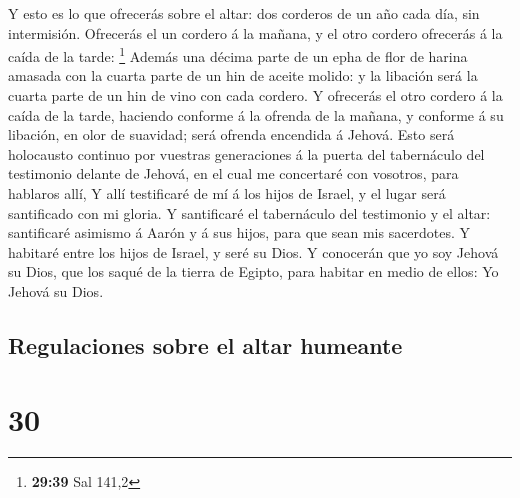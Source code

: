  Y esto es lo que ofrecerás sobre el altar: dos corderos
de un año cada día, sin intermisión.  Ofrecerás el un
cordero á la mañana, y el otro cordero ofrecerás á la caída de la tarde:
\footnote{\textbf{29:39} Sal 141,2}  Además una décima
parte de un epha de flor de harina amasada con la cuarta parte de un hin
de aceite molido: y la libación será la cuarta parte de un hin de vino
con cada cordero.  Y ofrecerás el otro cordero á la caída
de la tarde, haciendo conforme á la ofrenda de la mañana, y conforme á
su libación, en olor de suavidad; será ofrenda encendida á Jehová.
 Esto será holocausto continuo por vuestras generaciones
á la puerta del tabernáculo del testimonio delante de Jehová, en el cual
me concertaré con vosotros, para hablaros allí,  Y allí
testificaré de mí á los hijos de Israel, y el lugar será santificado con
mi gloria.  Y santificaré el tabernáculo del testimonio y
el altar: santificaré asimismo á Aarón y á sus hijos, para que sean mis
sacerdotes.  Y habitaré entre los hijos de Israel, y seré
su Dios.  Y conocerán que yo soy Jehová su Dios, que los
saqué de la tierra de Egipto, para habitar en medio de ellos: Yo Jehová
su Dios.

\hypertarget{regulaciones-sobre-el-altar-humeante}{%
\subsection{Regulaciones sobre el altar
humeante}\label{regulaciones-sobre-el-altar-humeante}}

\hypertarget{section-29}{%
\section{30}\label{section-29}}

